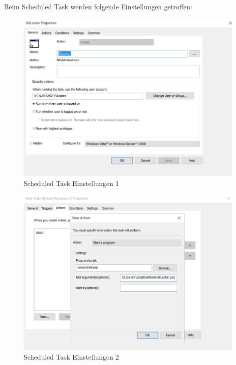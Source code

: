 Beim Scheduled Task werden folgende Einstellungen getroffen:\\
\begin{minipage}{0.5\linewidth}
    \begin{figure}[H]
        \centering
        \includegraphics[width=\linewidth]{../img/Encryption/scheduled-task-1.png}
        \caption{Scheduled Task Einstellungen 1}
    \end{figure}
\end{minipage}
\begin{minipage}{0.5\linewidth}
    \begin{figure}[H]
        \centering
        \includegraphics[width=\linewidth]{../img/Encryption/scheduled-task-2.png}
        \caption{Scheduled Task Einstellungen 2}
    \end{figure}
\end{minipage}\\

